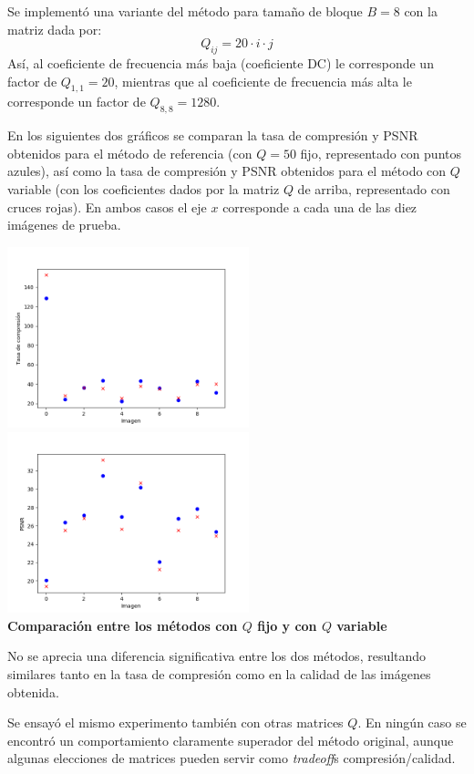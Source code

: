 \documentclass{article}
\begin{document}
Se implementó una variante del método para tamaño de bloque $B = 8$ con la
matriz dada por:
\[
  Q_{ij} = 20 \cdot i \cdot j
\]
Así, al coeficiente de frecuencia más baja (coeficiente DC)
le corresponde un factor de $Q_{1,1} = 20$,
mientras que al coeficiente de frecuencia más alta
le corresponde un factor de $Q_{8,8} = 1280$.
\medskip

En los siguientes dos gráficos se comparan la tasa de compresión y PSNR obtenidos
para el método de referencia (con $Q = 50$ fijo, representado con puntos azules),
así como la tasa de compresión y PSNR obtenidos
para el método con $Q$ variable (con los coeficientes dados por la matriz $Q$
de arriba, representado con cruces rojas).
En ambos casos el eje $x$ corresponde a cada una de las diez imágenes de prueba.
\begin{center}
  \includegraphics[width=7cm]{../imgs/output/qmatrix_plots/qmatrix_rate.png}
  \includegraphics[width=7cm]{../imgs/output/qmatrix_plots/qmatrix_psnr.png}\\
  {\bf Comparación entre los métodos con $Q$ fijo y con $Q$ variable}
\end{center}

No se aprecia una diferencia significativa entre los dos métodos,
resultando similares tanto en la tasa de compresión como en la calidad
de las imágenes obtenida.

Se ensayó el mismo experimento también con otras matrices $Q$.
En ningún caso se encontró un comportamiento claramente superador del
método original, aunque algunas elecciones de matrices pueden
servir como {\em tradeoff}s compresión/calidad.
\end{document}
